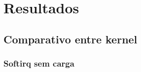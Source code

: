 




\section{Resultados}

\subsection{Comparativo entre kernel}

\subsubsection{Softirq sem carga}

